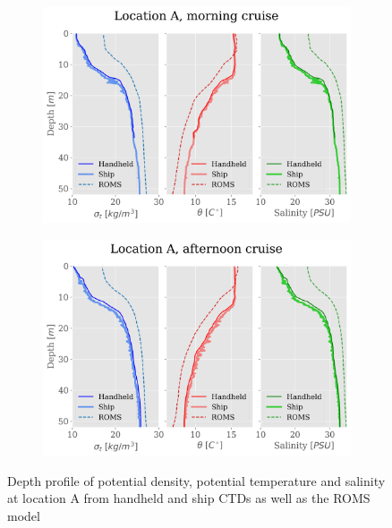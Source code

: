 \documentclass[a4paper,10pt,english]{article}
\begin{document}
\begin{figure}[H]
    \begin{adjustwidth}{-2.5cm}{-2.5cm}  %
    \begin{subfigure}{0.65\textwidth}
            \centering
            \includegraphics[width=1.\linewidth]{../figures/combined_profiles/Location_A_morning_cruise.png}
            \caption{}
            \label{fig:morning_A}
    \end{subfigure}%
    \begin{subfigure}{0.65\textwidth}
            \centering
            \includegraphics[width=1.\linewidth]{../figures/combined_profiles/Location_A_afternoon_cruise.png}
            \caption{}
            \label{fig:afternoon_A}
    \end{subfigure}
    \end{adjustwidth}
    
    \caption{Depth profile of potential density, potential temperature and salinity at location A from handheld and ship CTDs as well as the ROMS model}
    \label{fig:location_A}
\end{figure}
\end{document}
